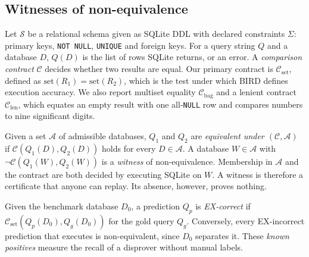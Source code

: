 \subsection{Witnesses of non-equivalence}
Let $\mathcal S$ be a relational schema given as SQLite DDL with declared constraints $\Sigma$: primary keys, \texttt{NOT NULL}, \texttt{UNIQUE} and foreign keys. For a query string $Q$ and a database $D$, $Q(D)$ is the list of rows SQLite returns, or an error. A \emph{comparison contract} $\mathcal C$ decides whether two results are equal. Our primary contract is $\mathcal C_{\mathrm{set}}$, defined as $\mathrm{set}(R_1)=\mathrm{set}(R_2)$, which is the test under which BIRD defines execution accuracy. We also report multiset equality $\mathcal C_{\mathrm{bag}}$ and a lenient contract $\mathcal C_{\mathrm{len}}$, which equates an empty result with one all-\texttt{NULL} row and compares numbers to nine significant digits.

Given a set $\mathcal A$ of admissible databases, $Q_1$ and $Q_2$ are \emph{equivalent under $(\mathcal C,\mathcal A)$} if $\mathcal C(Q_1(D),Q_2(D))$ holds for every $D\in\mathcal A$. A database $W\in\mathcal A$ with $\neg\mathcal C(Q_1(W),Q_2(W))$ is a \emph{witness} of non-equivalence. Membership in $\mathcal A$ and the contract are both decided by executing SQLite on $W$. A witness is therefore a certificate that anyone can replay. Its absence, however, proves nothing.

Given the benchmark database $D_0$, a prediction $Q_p$ is \emph{EX-correct} if $\mathcal C_{\mathrm{set}}(Q_p(D_0),\allowbreak Q_g(D_0))$ for the gold query $Q_g$. Conversely, every EX-incorrect prediction that executes is non-equivalent, since $D_0$ separates it. These \emph{known positives} measure the recall of a disprover without manual labels.

